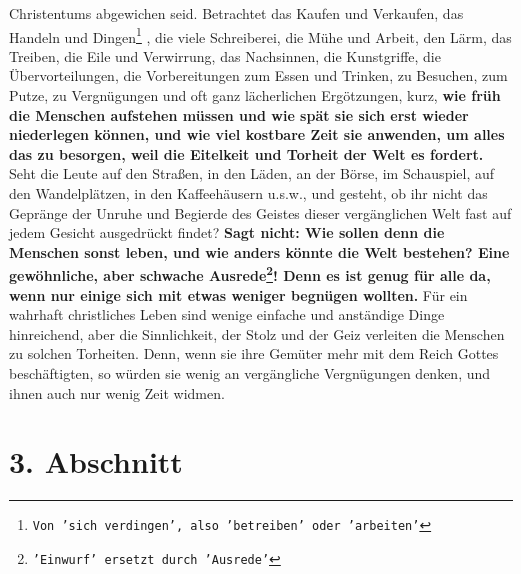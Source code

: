 Christentums abgewichen seid. Betrachtet das Kaufen und Verkaufen, das Handeln
und Dingen\footnote{\texttt{Von 'sich verdingen', also 'betreiben' oder
'arbeiten'}}
, die viele Schreiberei, die Mühe und Arbeit, den Lärm, das Treiben,
die Eile und Verwirrung, das Nachsinnen, die Kunstgriffe, die
Übervorteilungen, die Vorbereitungen zum Essen und Trinken, zu Besuchen, zum
Putze, zu Vergnügungen und oft ganz lächerlichen Ergötzungen, kurz, \textbf{wie
früh die
Menschen aufstehen müssen und wie spät sie sich erst wieder niederlegen können,
und wie viel kostbare Zeit sie anwenden, um alles das zu besorgen, weil die
Eitelkeit und Torheit der Welt es fordert.} Seht die Leute auf den Straßen, in
den
Läden, an der Börse, im Schauspiel, auf den Wandelplätzen, in den
Kaffeehäusern u.s.w., und gesteht, ob ihr nicht das Gepränge der Unruhe und
Begierde des Geistes dieser vergänglichen Welt fast auf jedem Gesicht
ausgedrückt findet?
\label{ref:15_02_genug_fuer_alle}
\textbf{Sagt nicht: Wie sollen denn die Menschen sonst leben, und
wie anders könnte die Welt bestehen? Eine gewöhnliche, aber schwache
Ausrede\footnote{\texttt{'Einwurf' ersetzt durch 'Ausrede'}}!
Denn es ist genug für alle da, wenn nur einige
sich mit 
etwas weniger begnügen
wollten.} Für ein wahrhaft christliches Leben sind
wenige 
einfache und anständige
Dinge hinreichend, aber die Sinnlichkeit, der Stolz und der Geiz verleiten die
Menschen zu solchen Torheiten. Denn, wenn sie ihre Gemüter mehr mit dem Reich
Gottes beschäftigten, so würden sie wenig an vergängliche Vergnügungen denken,
und ihnen auch nur wenig Zeit widmen.

\section{3. Abschnitt} \label{kap15_ab3}

